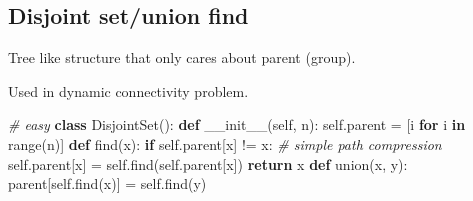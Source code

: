 \documentclass[
]{article}
\newenvironment{Shaded}{}{}
\newcommand{\BuiltInTok}[1]{#1}
\newcommand{\CommentTok}[1]{\textcolor[rgb]{0.38,0.63,0.69}{\textit{#1}}}
\newcommand{\ControlFlowTok}[1]{\textcolor[rgb]{0.00,0.44,0.13}{\textbf{#1}}}
\newcommand{\FunctionTok}[1]{\textcolor[rgb]{0.02,0.16,0.49}{#1}}
\newcommand{\KeywordTok}[1]{\textcolor[rgb]{0.00,0.44,0.13}{\textbf{#1}}}
\newcommand{\NormalTok}[1]{#1}
\newcommand{\OperatorTok}[1]{\textcolor[rgb]{0.40,0.40,0.40}{#1}}
\newcommand{\VariableTok}[1]{\textcolor[rgb]{0.10,0.09,0.49}{#1}}
\begin{document}
\hypertarget{disjoint-setunion-find}{%
\subsection{Disjoint set/union find}\label{disjoint-setunion-find}}

Tree like structure that only cares about parent (group).

Used in dynamic connectivity problem.

\begin{Shaded}
\begin{Highlighting}[]
\CommentTok{\# easy}
\KeywordTok{class}\NormalTok{ DisjointSet():}
    \KeywordTok{def} \FunctionTok{\_\_init\_\_}\NormalTok{(}\VariableTok{self}\NormalTok{, n):}
        \VariableTok{self}\NormalTok{.parent }\OperatorTok{=}\NormalTok{ [i }\ControlFlowTok{for}\NormalTok{ i }\KeywordTok{in} \BuiltInTok{range}\NormalTok{(n)]}
    \KeywordTok{def}\NormalTok{ find(x):}
        \ControlFlowTok{if} \VariableTok{self}\NormalTok{.parent[x] }\OperatorTok{!=}\NormalTok{ x:}
            \CommentTok{\# simple path compression}
            \VariableTok{self}\NormalTok{.parent[x] }\OperatorTok{=} \VariableTok{self}\NormalTok{.find(}\VariableTok{self}\NormalTok{.parent[x])}
        \ControlFlowTok{return}\NormalTok{ x}
   	\KeywordTok{def}\NormalTok{ union(x, y):   }
\NormalTok{        parent[}\VariableTok{self}\NormalTok{.find(x)] }\OperatorTok{=} \VariableTok{self}\NormalTok{.find(y)}


\end{Highlighting}
\end{Shaded}
\end{document}
